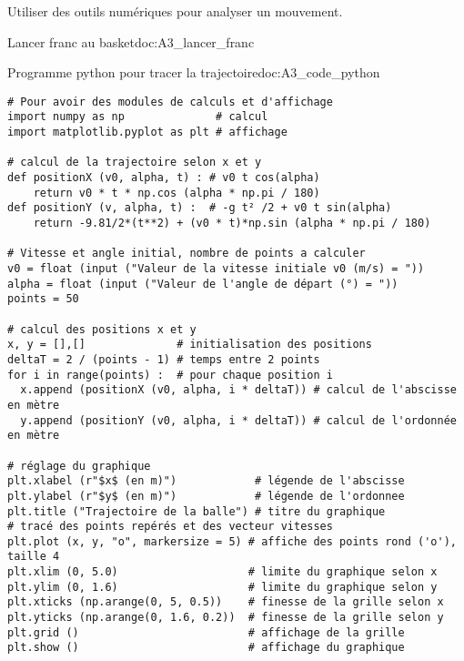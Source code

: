 \teteSndMouv

\nomPrenomClasse



\begin{objectifs}
  \item Utiliser des outils numériques pour analyser un mouvement.
\end{objectifs}

\begin{doc}{Lancer franc au basket}{doc:A3_lancer_franc}
  \begin{center}
  \end{center}
\end{doc}


\begin{doc}{Programme python pour tracer la trajectoire}{doc:A3_code_python}
  \vspace*{-8pt}
  \lstset{style=codePython, language=python}
  \begin{lstlisting}
# Pour avoir des modules de calculs et d'affichage
import numpy as np              # calcul
import matplotlib.pyplot as plt # affichage

# calcul de la trajectoire selon x et y
def positionX (v0, alpha, t) : # v0 t cos(alpha)
    return v0 * t * np.cos (alpha * np.pi / 180) 
def positionY (v, alpha, t) :  # -g t² /2 + v0 t sin(alpha)
    return -9.81/2*(t**2) + (v0 * t)*np.sin (alpha * np.pi / 180) 

# Vitesse et angle initial, nombre de points a calculer
v0 = float (input ("Valeur de la vitesse initiale v0 (m/s) = "))
alpha = float (input ("Valeur de l'angle de départ (°) = "))
points = 50

# calcul des positions x et y
x, y = [],[]              # initialisation des positions
deltaT = 2 / (points - 1) # temps entre 2 points
for i in range(points) :  # pour chaque position i
  x.append (positionX (v0, alpha, i * deltaT)) # calcul de l'abscisse en mètre
  y.append (positionY (v0, alpha, i * deltaT)) # calcul de l'ordonnée en mètre
  
# réglage du graphique
plt.xlabel (r"$x$ (en m)")            # légende de l'abscisse
plt.ylabel (r"$y$ (en m)")            # légende de l'ordonnee
plt.title ("Trajectoire de la balle") # titre du graphique
# tracé des points repérés et des vecteur vitesses
plt.plot (x, y, "o", markersize = 5) # affiche des points rond ('o'), taille 4
plt.xlim (0, 5.0)                    # limite du graphique selon x
plt.ylim (0, 1.6)                    # limite du graphique selon y
plt.xticks (np.arange(0, 5, 0.5))    # finesse de la grille selon x
plt.yticks (np.arange(0, 1.6, 0.2))  # finesse de la grille selon y
plt.grid ()                          # affichage de la grille
plt.show ()                          # affichage du graphique\end{lstlisting}
  \vspace*{-8pt}
\end{doc}

